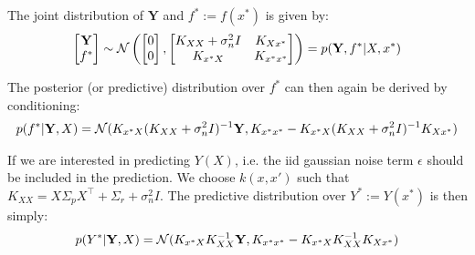 The joint distribution of $\mathbf{Y}$ and $f^{\ast} := f(x^{\ast})$ is given by:
\begin{gather}
    \begin{bmatrix}
        \mathbf{Y} \\
        f^{\ast}
    \end{bmatrix}
    \sim \operatorname{\mathcal{N}} \left(
        \begin{bmatrix}
        0 \\
        0
        \end{bmatrix},
        \begin{bmatrix}
        K_{XX} + \sigma_n^2 I & K_{Xx^{\ast}} \\
        K_{x^{\ast}X} & K_{x^{\ast}x^{\ast}}
        \end{bmatrix}
        \right)
    = p(\mathbf{Y}, f^{\ast}| X, x^{\ast})
\end{gather}


The posterior (or predictive) distribution over $f^{\ast}$ can then again be derived by conditioning:
\begin{gather}\label{eq:posterior-gp}
    p(f^{\ast}| \mathbf{Y}, X) = \operatorname{\mathcal{N}}(
K_{x^{\ast}X} (K_{XX} + \sigma_n^2 I)^{-1} \mathbf{Y},
K_{x^{\ast}x^{\ast}} - K_{x^{\ast}X}(K_{XX} + \sigma_n^2 I)^{-1}K_{Xx^{\ast}})
\end{gather}

If we are interested in predicting $Y(X)$, i.e. the iid gaussian noise term $\epsilon$
should be included in the prediction. We choose $k(x,x')$ such that
$K_{XX} =  X \Sigma_p X^{\top} + \Sigma_r + \sigma_n^2 I$.
The predictive distribution over
$Y^{\ast} := Y(x^{\ast})$ is then simply:
\begin{gather}\label{eq:posterior-gp-noise}
    p(Y^{\ast}| \mathbf{Y}, X) = \operatorname{\mathcal{N}}(
K_{x^{\ast}X} K_{XX}^{-1} \mathbf{Y},
K_{x^{\ast}x^{\ast}} - K_{x^{\ast}X} K_{XX}^{-1} K_{Xx^{\ast}})
\end{gather}


%



